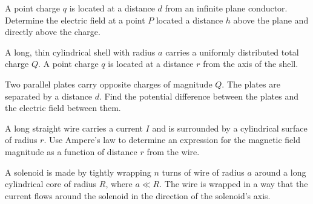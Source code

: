 \documentclass[12pt]{exam}
\begin{document}
\begin{questions}

\question[10] A point charge $q$ is located at a distance $d$ from an infinite plane conductor. Determine the electric field at a point $P$ located a distance $h$ above the plane and directly above the charge.

\vspace{8cm}

\question[15] A long, thin cylindrical shell with radius $a$ carries a uniformly distributed total charge $Q$. A point charge $q$ is located at a distance $r$ from the axis of the shell.

\question[10] Two parallel plates carry opposite charges of magnitude $Q$. The plates are separated by a distance $d$. Find the potential difference between the plates and the electric field between them.

\vspace{8cm}

\question[15] A long straight wire carries a current $I$ and is surrounded by a cylindrical surface of radius $r$. Use Ampere's law to determine an expression for the magnetic field magnitude as a function of distance $r$ from the wire.

\vspace{8cm}

\question[20] A solenoid is made by tightly wrapping $n$ turns of wire of radius $a$ around a long cylindrical core of radius $R$, where $a \ll R$. The wire is wrapped in a way that the current flows around the solenoid in the direction of the solenoid's axis.
\end{questions}
\end{document}

